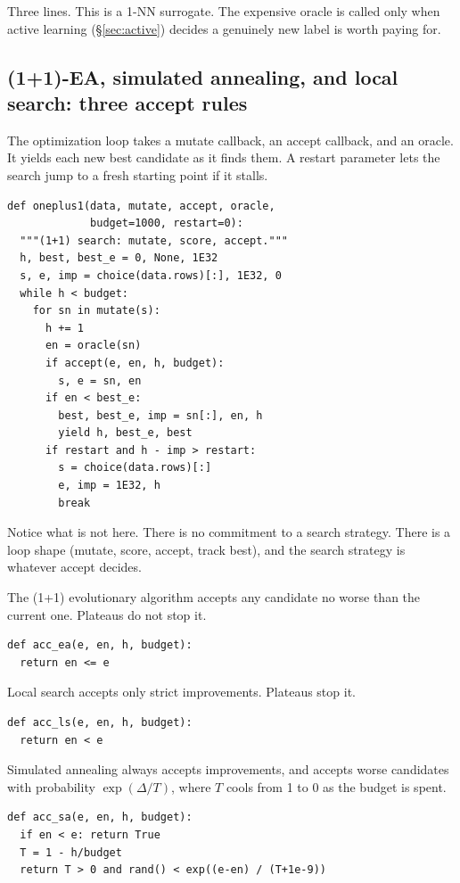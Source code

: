 Three lines. This is a 1-NN surrogate. The expensive oracle is
called only when active learning (\S\ref{sec:active}) decides a
genuinely new label is worth paying for.

\subsection{(1+1)-EA, simulated annealing, and local search:
three accept rules}

The optimization loop takes a mutate callback, an accept
callback, and an oracle. It yields each new best candidate as it
finds them. A \textsf{restart} parameter lets the search jump to
a fresh starting point if it stalls.

\begin{verbatim}
def oneplus1(data, mutate, accept, oracle,
             budget=1000, restart=0):
  """(1+1) search: mutate, score, accept."""
  h, best, best_e = 0, None, 1E32
  s, e, imp = choice(data.rows)[:], 1E32, 0
  while h < budget:
    for sn in mutate(s):
      h += 1
      en = oracle(sn)
      if accept(e, en, h, budget):
        s, e = sn, en
      if en < best_e:
        best, best_e, imp = sn[:], en, h
        yield h, best_e, best
      if restart and h - imp > restart:
        s = choice(data.rows)[:]
        e, imp = 1E32, h
        break
\end{verbatim}

Notice what is not here. There is no commitment to a search
strategy. There is a loop shape (mutate, score, accept, track
best), and the search strategy is whatever \textsf{accept}
decides.

The (1+1) evolutionary algorithm accepts any candidate no worse
than the current one. Plateaus do not stop it.

\begin{verbatim}
def acc_ea(e, en, h, budget):
  return en <= e
\end{verbatim}

Local search accepts only strict improvements. Plateaus stop it.

\begin{verbatim}
def acc_ls(e, en, h, budget):
  return en < e
\end{verbatim}

Simulated annealing always accepts improvements, and accepts
worse candidates with probability $\exp(\Delta/T)$, where $T$
cools from 1 to 0 as the budget is spent.

\begin{verbatim}
def acc_sa(e, en, h, budget):
  if en < e: return True
  T = 1 - h/budget
  return T > 0 and rand() < exp((e-en) / (T+1e-9))
\end{verbatim}

